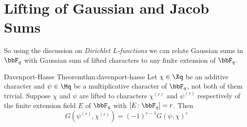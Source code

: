 \section{Lifting of Gaussian and Jacob Sums}
So using the discussion on \emph{Dirichlet $L$-functions} we can relate Gaussian sums in $\bbF_q$ with Gaussian sum of lifted characters to any finite extension of $\bbF_q$. 
\begin{Theorem}{Davenport-Hasse Theorem}{thm:davenport-hasse}
  Let $\chi\in\Xq$ be an additive character and $\psi\in\Mq$ be a multiplicative character of $\bbF_q$, not both of them trivial. Suppose $\chi$ and $\psi$ are lifted to characters $\chi^{(r)}$ and $\psi^{(r)}$ respectively of the finite extension field $E$ of $\bbF_q$ with $[E\colon \bbF_q]=r$. Then $$G(\psi^{(r)},\chi^{(r)})=(-1)^{r-1}G(\psi,\chi)^r$$
\end{Theorem}
